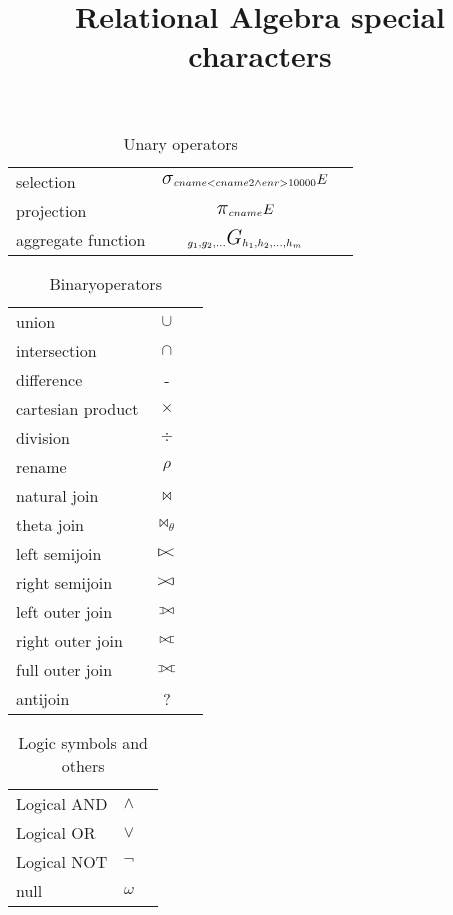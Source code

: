 \documentclass[]{article}
\def\ojoin{\setbox0=\hbox{$\bowtie$}%
      \rule[-.02ex]{.25em}{.4pt}\llap{\rule[\ht0]{.25em}{.4pt}}}
\def\leftouterjoin{\mathbin{\ojoin\mkern-5.8mu\bowtie}}
\def\rightouterjoin{\mathbin{\bowtie\mkern-5.8mu\ojoin}}
\def\fullouterjoin{\mathbin{\ojoin\mkern-5.8mu\bowtie\mkern-5.8mu\ojoin}}
\newcommand{\select}{\mbox{\Large$\sigma$}}
\newcommand{\cross}{\mbox{$\times$}}
\newcommand{\intersection}{\mbox{$\cap$}}
\newcommand{\union}{\mbox{$\cup$}}
\newcommand{\leftsemijoin}{\mbox{$\mathrel{\raise1pt\hbox{\vrule height5pt
    depth0pt width0.6pt\hskip-1.5pt$>$\hskip -2.5pt$<$}}$}}
\newcommand{\rightsemijoin}{\mbox{$\mathrel{\raise1pt\hbox{\hskip-1.5pt$>$\hskip -2.5pt$<$\hskip -1.1pt\vrule height5pt
    depth0pt width0.6pt}}$}}
\newcommand{\project}{\mbox{\Large$\pi$}}
\newcommand{\aggregatefn}{\mbox{\Large$G$}}
\begin{document}
\title{Relational Algebra special characters}
\maketitle

\begin{table}[!th]
	\begin{tabular}{|l|c|r|}
		\hline
		selection          & $\select_{cname<cname2 \wedge enr>10000} E$     \\
		projection         & $\project_{cname} E$                            \\
		aggregate function & $_{g_1,g_2,...} \aggregatefn_{h_1,h_2,...,h_m}$ \\
		\hline
	\end{tabular}
	\caption{Unary operators}
\end{table}

\begin{table}[!th]
	\begin{tabular}{|l|c|r|}
		\hline
		union             & \union             \\
		intersection      & \intersection      \\
		difference        & -                  \\
		cartesian product & \cross             \\
		division          & $\div$             \\
		rename            & $\rho$             \\
		natural join      & $\bowtie$          \\
		theta join        & $\bowtie_{\theta}$ \\
		left semijoin     & $\leftsemijoin$    \\
		right semijoin    & $\rightsemijoin$   \\
		left outer join   & $\leftouterjoin$   \\
		right outer join  & $\rightouterjoin$  \\
		full outer join   & $\fullouterjoin$   \\
		antijoin          & ?                  \\
		\hline
	\end{tabular}
	\caption{Binaryoperators}
\end{table}

\begin{table}[!th]
	\begin{tabular}{|l|c|r|}
		\hline
		Logical AND & $\wedge$ \\
		Logical OR  & $\vee$   \\
		Logical NOT & $\neg$   \\
		null        & $\omega$ \\
		\hline
	\end{tabular}
	\caption{Logic symbols and others}
\end{table}
\end{document}
